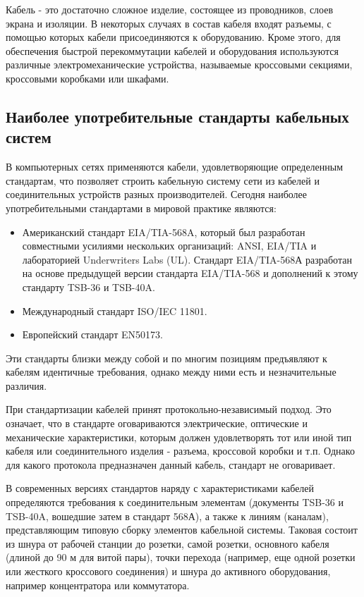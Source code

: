 Кабель - это достаточно сложное изделие, состоящее из проводников, слоев экрана и изоляции.
В некоторых случаях в состав кабеля входят разъемы, с помощью которых кабели присоединяются к оборудованию.
Кроме этого, для обеспечения быстрой перекоммутации кабелей и оборудования используются различные электромеханические устройства, называемые кроссовыми секциями, кроссовыми коробками или шкафами.

\subsection{Наиболее употребительные стандарты кабельных систем}

В компьютерных сетях применяются кабели, удовлетворяющие определенным стандартам, что позволяет строить кабельную систему сети из кабелей и соединительных устройств разных производителей.
Сегодня наиболее употребительными стандартами в мировой практике являются:
\begin{itemize}
    \item Американский стандарт EIA/TIA-568A, который был разработан совместными усилиями нескольких организаций: ANSI, EIA/TIA и лабораторией Underwriters Labs (UL).
        Стандарт EIA/TIA-568А разработан на основе предыдущей версии стандарта EIA/TIA-568 и дополнений к этому стандарту TSB-36 и TSB-40A.
    \item Международный стандарт ISO/IEC 11801.
    \item Европейский стандарт EN50173.
\end{itemize}

Эти стандарты близки между собой и по многим позициям предъявляют к кабелям идентичные требования, однако между ними есть и незначительные различия.

При стандартизации кабелей принят протокольно-независимый подход.
Это означает, что в стандарте оговариваются электрические, оптические и механические характеристики, которым должен удовлетворять тот или иной тип кабеля или соединительного изделия - разъема, кроссовой коробки и т.п.
Однако для какого протокола предназначен данный кабель, стандарт не оговаривает.

В современных версиях стандартов наряду с характеристиками кабелей определяются требования к соединительным элементам (документы TSB-36 и TSB-40A, вошедшие затем в стандарт 568А), а также к линиям (каналам), представляющим типовую сборку элементов кабельной системы.
Таковая состоит из шнура от рабочей станции до розетки, самой розетки, основного кабеля (длиной до 90 м для витой пары), точки перехода (например, еще одной розетки или жесткого кроссового соединения) и шнура до активного оборудования, например концентратора или коммутатора.

